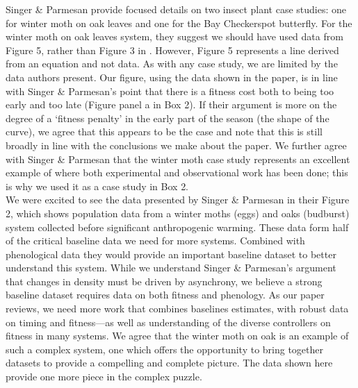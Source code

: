 \documentclass[11pt,letter]{article}
\begin{document}
Singer \& Parmesan provide focused details on two insect plant case studies: one for winter moth on oak leaves and one for the Bay Checkerspot butterfly. For the winter moth on oak leaves system, they suggest we should have used data from Figure 5, rather than Figure 3 in \citet{tikka2003}. However, Figure 5 represents a line derived from an equation and not data. As with any case study, we are limited by the data authors present. Our figure, using the data shown in the paper, is in line with Singer \& Parmesan's point that there is a fitness cost both to being too early and too late (Figure panel a in Box 2). If their argument is more on the degree of a `fitness penalty' in the early part of the season (the shape of the curve), we agree that this appears to be the case and note that this is still broadly in line with the conclusions we make about the paper. We further agree with Singer \& Parmesan that the winter moth case study represents an excellent example of where both experimental and observational work has been done; this is why we used it as a case study in Box 2. \\


We were excited to see the data presented by Singer \& Parmesan in their Figure 2, which shows population data from a winter moths (eggs) and oaks (budburst) system collected before significant anthropogenic warming. These data form half of the critical baseline data we need for more systems. Combined with phenological data they would provide an important baseline dataset to better understand this system. While we understand Singer \& Parmesan's argument that changes in density must be driven by asynchrony, we believe a strong baseline dataset requires data on both fitness and phenology. As our paper reviews, we need more work that combines baselines estimates, with robust data on timing and fitness---as well as understanding of the diverse controllers on fitness in many systems. We agree that the winter moth on oak is an example of such a complex system, one which offers the opportunity to bring together datasets to provide a compelling and complete picture. The data shown here provide one more piece in the complex puzzle. \\
\end{document}
